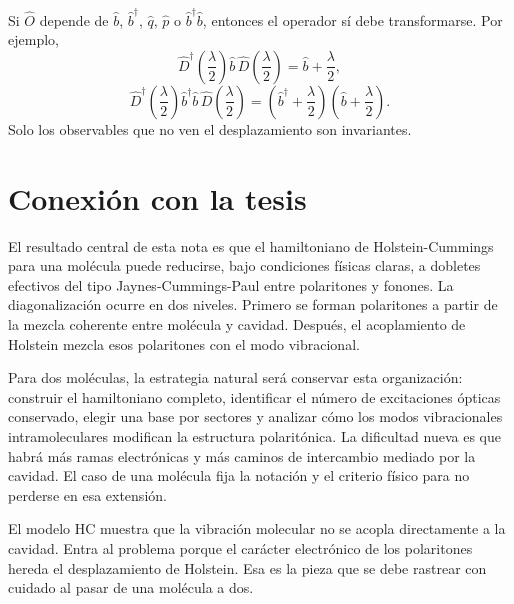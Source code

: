 \documentclass[11pt]{article}
\newcommand{\bdag}{\hat b^\dagger}
\begin{document}
Si $\hat O$ depende de $\hat b$, $\bdag$, $\hat q$, $\hat p$ o
$\bdag\hat b$, entonces el operador s\'i debe transformarse. Por ejemplo,
\begin{equation}
  \hat D^\dagger\!\left(\frac{\lambda}{2}\right)
  \hat b\,
  \hat D\!\left(\frac{\lambda}{2}\right)
  =
  \hat b+\frac{\lambda}{2},
\end{equation}
\begin{equation}
  \hat D^\dagger\!\left(\frac{\lambda}{2}\right)
  \bdag\hat b\,
  \hat D\!\left(\frac{\lambda}{2}\right)
  =
  \left(\bdag+\frac{\lambda}{2}\right)
  \left(\hat b+\frac{\lambda}{2}\right).
\end{equation}
Solo los observables que no ven el desplazamiento son invariantes.

\section{Conexi\'on con la tesis}

El resultado central de esta nota es que el hamiltoniano de Holstein-Cummings
para una mol\'ecula puede reducirse, bajo condiciones f\'isicas claras, a
dobletes efectivos del tipo Jaynes-Cummings-Paul entre polaritones y fonones.
La diagonalizaci\'on ocurre en dos niveles. Primero se forman polaritones a
partir de la mezcla coherente entre mol\'ecula y cavidad. Despu\'es, el
acoplamiento de Holstein mezcla esos polaritones con el modo vibracional.

Para dos mol\'eculas, la estrategia natural ser\'a conservar esta
organizaci\'on: construir el hamiltoniano completo, identificar el n\'umero de
excitaciones \'opticas conservado, elegir una base por sectores y analizar
c\'omo los modos vibracionales intramoleculares modifican la estructura
polarit\'onica. La dificultad nueva es que habr\'a m\'as ramas electr\'onicas y
m\'as caminos de intercambio mediado por la cavidad. El caso de una mol\'ecula
fija la notaci\'on y el criterio f\'isico para no perderse en esa extensi\'on.

\bigskip

El modelo HC muestra que la vibraci\'on molecular no se acopla directamente a
la cavidad. Entra al problema porque el car\'acter electr\'onico de los
polaritones hereda el desplazamiento de Holstein. Esa es la pieza que se debe
rastrear con cuidado al pasar de una mol\'ecula a dos.
\end{document}
